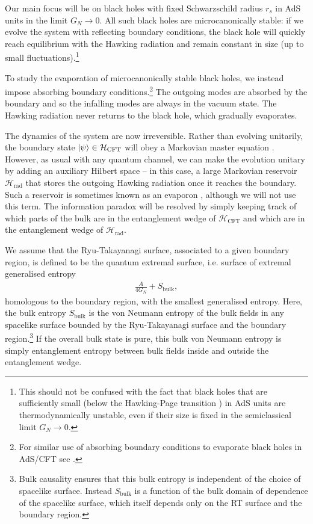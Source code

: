 \documentclass[12pt]{article}
\begin{document}
Our main focus will be on black holes with fixed Schwarzschild radius $r_s$ in AdS units in the limit $G_N \to 0$. All such black holes are microcanonically stable: if we evolve the system with reflecting boundary conditions, the black hole will quickly reach equilibrium with the Hawking radiation and remain constant in size (up to small fluctuations).\footnote{This should not be confused with the fact that black holes that are sufficiently small (below the Hawking-Page transition \cite{hawking1983thermodynamics}) in AdS units are thermodynamically unstable, even if their size is fixed in the semiclassical limit $G_N \to 0$.}

To study the evaporation of microcanonically stable black holes, we instead impose absorbing boundary conditions.\footnote{For similar use of absorbing boundary conditions to evaporate black holes in AdS/CFT see \cite{almheiri2018holographic, rocha2008evaporation, van2014evaporating}.} The outgoing modes are absorbed by the boundary and so the infalling modes are always in the vacuum state. The Hawking radiation never returns to the black hole, which gradually evaporates.

The dynamics of the system are now irreversible. Rather than evolving unitarily, the boundary state $\ket{\psi} \in \mathcal{H}_\text{CFT}$ will obey a Markovian master equation \cite{preskill1998lecture}. However, as usual with any quantum channel, we can make the evolution unitary by adding an auxiliary Hilbert space -- in this case, a large Markovian reservoir $\mathcal{H}_\text{rad}$ that stores the outgoing Hawking radiation once it reaches the boundary. Such a reservoir is sometimes known as an evaporon \cite{rocha2008evaporation}, although we will not use this term. The information paradox will be resolved by simply keeping track of which parts of the bulk are in the entanglement wedge of $\mathcal{H}_\text{CFT}$ and which are in the entanglement wedge of $\mathcal{H}_\text{rad}$.

We assume that the Ryu-Takayanagi surface, associated to a given boundary region, is defined to be the quantum extremal surface, i.e. surface of extremal generalised entropy
\begin{align} \label{eq:genentropy}
\frac{A}{4G_N} + S_\text{bulk},
\end{align}
homologous to the boundary region, with the smallest generalised entropy. Here, the bulk entropy $S_\text{bulk}$ is the von Neumann entropy of the bulk fields in any spacelike surface bounded by the Ryu-Takayanagi surface and the boundary region.\footnote{Bulk causality ensures that this bulk entropy is independent of the choice of spacelike surface. Instead $S_\text{bulk}$ is a function of the bulk domain of dependence of the spacelike surface, which itself depends only on the RT surface and the boundary region.} If the overall bulk state is pure, this bulk von Neumann entropy is simply entanglement entropy between bulk fields inside and outside the entanglement wedge. 
\end{document}
